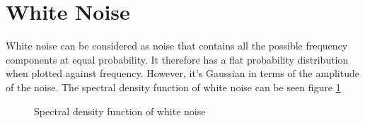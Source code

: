 \section{White Noise}
White noise can be considered as noise that contains all the possible frequency components at equal probability. It therefore has a flat probability distribution when plotted against frequency. However, it's Gaussian in terms of the amplitude of the noise. The spectral density function of white noise can be seen figure \ref{fig: white noise}
	
	\begin{figure}[h]
		\centering
		\caption{Spectral density function of white noise}
		\label{fig: white noise}
	\end{figure}